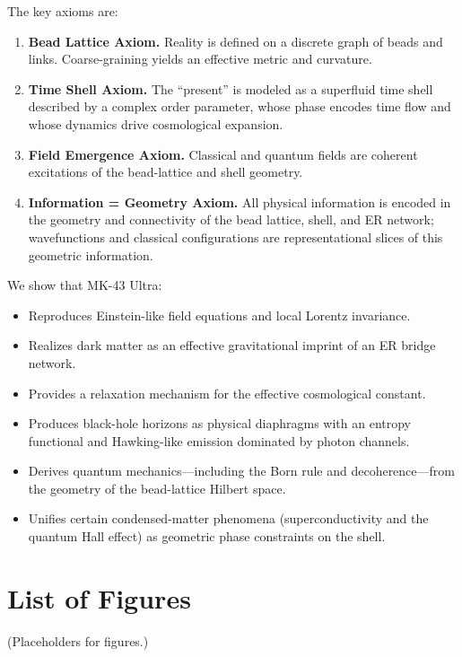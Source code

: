 \documentclass[11pt,oneside]{book}
\theoremstyle{definition}
\begin{document}
The key axioms are:

\begin{enumerate}[label=\textbf{A\arabic*}.]
    \item \textbf{Bead Lattice Axiom.} Reality is defined on a discrete graph of beads and links. Coarse-graining yields an effective metric and curvature.
    \item \textbf{Time Shell Axiom.} The ``present'' is modeled as a superfluid time shell described by a complex order parameter, whose phase encodes time flow and whose dynamics drive cosmological expansion.
    \item \textbf{Field Emergence Axiom.} Classical and quantum fields are coherent excitations of the bead-lattice and shell geometry.
    \item \textbf{Information = Geometry Axiom.} All physical information is encoded in the geometry and connectivity of the bead lattice, shell, and ER network; wavefunctions and classical configurations are representational slices of this geometric information.
\end{enumerate}

We show that MK-43 Ultra:
\begin{itemize}
    \item Reproduces Einstein-like field equations and local Lorentz invariance.
    \item Realizes dark matter as an effective gravitational imprint of an ER bridge network.
    \item Provides a relaxation mechanism for the effective cosmological constant.
    \item Produces black-hole horizons as physical diaphragms with an entropy functional and Hawking-like emission dominated by photon channels.
    \item Derives quantum mechanics---including the Born rule and decoherence---from the geometry of the bead-lattice Hilbert space.
    \item Unifies certain condensed-matter phenomena (superconductivity and the quantum Hall effect) as geometric phase constraints on the shell.
\end{itemize}

\tableofcontents

\chapter*{List of Figures}
(Placeholders for figures.)
\end{document}

